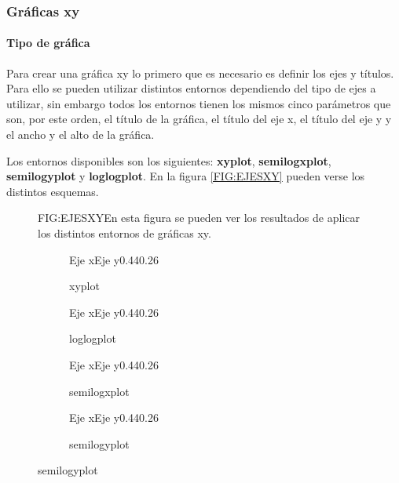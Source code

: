 \subsubsection{Gráficas xy}

\paragraph{Tipo de gráfica}

Para crear una gráfica xy lo primero que es necesario es definir los ejes y títulos. Para ello se pueden utilizar distintos entornos dependiendo del tipo de ejes a utilizar, sin embargo todos los entornos tienen los mismos cinco parámetros que son, por este orden, el título de la gráfica, el título del eje x, el título del eje y y el ancho y el alto de la gráfica.

Los entornos disponibles son los siguientes: \textbf{xyplot}, \textbf{semilogxplot}, \textbf{semilogyplot} y \textbf{loglogplot}. En la figura \ref{FIG:EJESXY} pueden verse los distintos esquemas.

\begin{figure}[Esquemas de ejes de gráficas XY]{FIG:EJESXY}{En esta figura se pueden ver los resultados de aplicar los distintos entornos de gráficas xy.}
  \begin{subfigure}[b]{0.48\linewidth}
    \centering
    \begin{xyplot}{}{Eje x}{Eje y}{0.44\textwidth}{0.26\textheight}
    \end{xyplot}
    \caption{xyplot}\label{SFIG:XY}
  \end{subfigure}
  \begin{subfigure}[b]{0.48\linewidth}
    \centering
    \begin{loglogplot}{}{Eje x}{Eje y}{0.44\textwidth}{0.26\textheight}
    \end{loglogplot}
    \caption{loglogplot}\label{SFIG:LOGLOG}
  \end{subfigure}

  \begin{subfigure}[b]{0.48\linewidth}
    \centering
    \begin{semilogxplot}{}{Eje x}{Eje y}{0.44\textwidth}{0.26\textheight}
    \end{semilogxplot}
    \caption{semilogxplot}\label{SFIG:LOGX}
  \end{subfigure}
  \begin{subfigure}[b]{0.48\linewidth}
    \centering
    \begin{semilogyplot}{}{Eje x}{Eje y}{0.44\textwidth}{0.26\textheight}
    \end{semilogyplot}
    \caption{semilogyplot}\label{SFIG:LOGY}
  \end{subfigure}
\end{figure}

